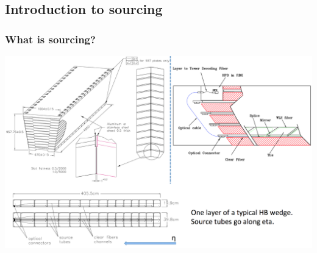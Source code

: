 \documentclass[bigger]{beamer}
\begin{document}
\subsection{Introduction to sourcing}
\label{sec-2-1}
\begin{frame}
\frametitle{What is sourcing?}
\label{sec-2-1-1}
\label{sec-2-1-1-1}

\centering
\includegraphics[width=.9\linewidth]{fig/sourcing/sourcing_schematic.png}
\end{frame}
\end{document}
